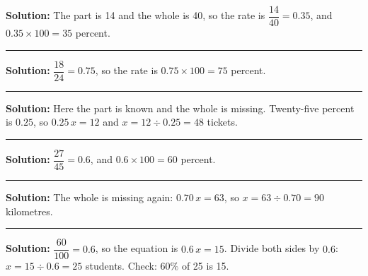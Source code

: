 \documentclass[12pt]{article}
\begin{document}



\textbf{Solution:} The part is 14 and the whole is 40, so the rate is
$\dfrac{14}{40} = 0.35$, and $0.35 \times 100 = 35$ percent. 

\vspace{0.25cm}\noindent\rule{\linewidth}{0.2pt}\vspace{0.25cm}


\textbf{Solution:} $\dfrac{18}{24} = 0.75$, so the rate is
$0.75 \times 100 = 75$ percent. 

\vspace{0.25cm}\noindent\rule{\linewidth}{0.2pt}\vspace{0.25cm}


\textbf{Solution:} Here the part is known and the whole is missing. Twenty-five
percent is $0.25$, so $0.25\,x = 12$ and $x = 12 \div 0.25 = 48$
tickets. 

\vspace{0.25cm}\noindent\rule{\linewidth}{0.2pt}\vspace{0.25cm}


\textbf{Solution:} $\dfrac{27}{45} = 0.6$, and $0.6 \times 100 = 60$
percent. 

\vspace{0.25cm}\noindent\rule{\linewidth}{0.2pt}\vspace{0.25cm}


\textbf{Solution:} The whole is missing again: $0.70\,x = 63$, so
$x = 63 \div 0.70 = 90$ kilometres. 

\vspace{0.25cm}\noindent\rule{\linewidth}{0.2pt}\vspace{0.25cm}


\textbf{Solution:} $\dfrac{60}{100} = 0.6$, so the equation is $0.6\,x = 15$.
Divide both sides by $0.6$: $x = 15 \div 0.6 = 25$ students. Check:
$60\%$ of 25 is 15. 
\end{document}
